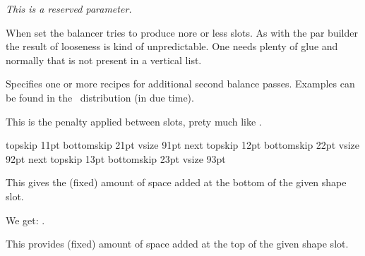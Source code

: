 \stopnewprimitive

\startnewprimitive[title={\prm {balancelineheight}}]

{\em This is a reserved parameter.}

\stopnewprimitive

\startnewprimitive[title={\prm {balancelooseness}}]

When set the balancer tries to produce nore or less slots. As with the par
builder the result of looseness is kind of unpredictable. One needs plenty of
glue and normally that is not present in a vertical list.

\stopnewprimitive

\startnewprimitive[title={\prm {balancepasses}}]

Specifies one or more recipes for additional second balance passes. Examples
can be found in the \CONTEXT\ distribution (in due time).

\stopnewprimitive

\startnewprimitive[title={\prm {balancepenalty}}]

This is the penalty applied between slots, prety much like .

\stopnewprimitive

\startnewprimitive[title={\prm {balanceshape}}]

\startbuffer[shape]
    topskip 11pt bottomskip 21pt vsize 91pt next
    topskip 12pt bottomskip 22pt vsize 92pt next
    topskip 13pt bottomskip 23pt vsize 93pt
\relax
\stopbuffer

\stopnewprimitive

\startnewprimitive[title={\prm {balanceshapebottomspace}}]

This gives the (fixed) amount of space added at the bottom of the given shape
slot.

\startbuffer
\the{} \space
\the{}
\stopbuffer

\typebuffer

\start \getbuffer[shape] We get: {\inlinebuffer}. \stop

\stopnewprimitive

\startnewprimitive[title={\prm {balanceshapetopspace}}]

This provides (fixed) amount of space added at the top of the given shape slot.

\startbuffer
\the{} \space
\the{}
\stopbuffer

\typebuffer

